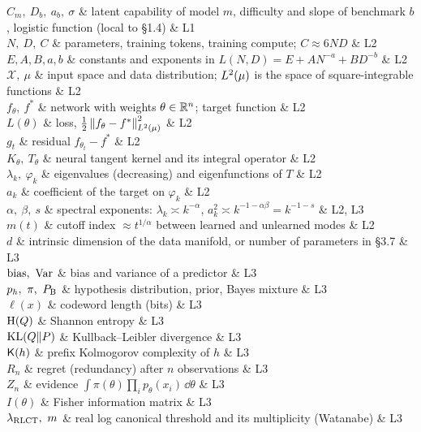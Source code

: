 \begin{notationchunk}
$C_m,\ D_b,\ a_b,\ \sigma$ & latent capability of model $m$, difficulty and slope of benchmark $b$, logistic function (local to \S1.4) & L1\\
$N,\ D,\ C$ & parameters, training tokens, training compute; $C\approx6ND$ & L2\\
$E,A,B,a,b$ & constants and exponents in $L(N,D)=E+AN^{-a}+BD^{-b}$ & L2\\
$\mathcal X,\ \mu$ & input space and data distribution; $L^2(\mu)$ is the space of square-integrable functions & L2\\
$f_\theta,\ f^*$ & network with weights $\theta\in\mathbb{R}^n$; target function & L2\\
$L(\theta)$ & loss, $\tfrac12\left\lVert f_\theta-f^*\right\rVert^2_{L^2(\mu)}$ & L2\\
$g_t$ & residual $f_{\theta_t}-f^*$ & L2\\
$K_\theta,\ T_\theta$ & neural tangent kernel and its integral operator & L2\\
$\lambda_k,\ \varphi_k$ & eigenvalues (decreasing) and eigenfunctions of $T$ & L2\\
$a_k$ & coefficient of the target on $\varphi_k$ & L2\\
$\alpha,\ \beta,\ s$ & spectral exponents: $\lambda_k\asymp k^{-\alpha}$, $a_k^2\asymp k^{-1-\alpha\beta}=k^{-1-s}$ & L2, L3\\
$m(t)$ & cutoff index $\approx t^{1/\alpha}$ between learned and unlearned modes & L2\\
$d$ & intrinsic dimension of the data manifold, or number of parameters in \S3.7 & L3\\
$\mathrm{bias},\ \operatorname{Var}$ & bias and variance of a predictor & L3\\
$p_h,\ \pi,\ P_{\mathrm{B}}$ & hypothesis distribution, prior, Bayes mixture & L3\\
$\ell(x)$ & codeword length (bits) & L3\\
$\mathrm{H}(Q)$ & Shannon entropy & L3\\
$\operatorname{KL}(Q\|P)$ & Kullback--Leibler divergence & L3\\
$\mathsf{K}(h)$ & prefix Kolmogorov complexity of $h$ & L3\\
$R_n$ & regret (redundancy) after $n$ observations & L3\\
$Z_n$ & evidence $\int\pi(\theta)\prod_ip_\theta(x_i)\,\dd\theta$ & L3\\
$I(\theta)$ & Fisher information matrix & L3\\
$\lambda_{\mathrm{RLCT}},\ m$ & real log canonical threshold and its multiplicity (Watanabe) & L3\\

\end{notationchunk}
